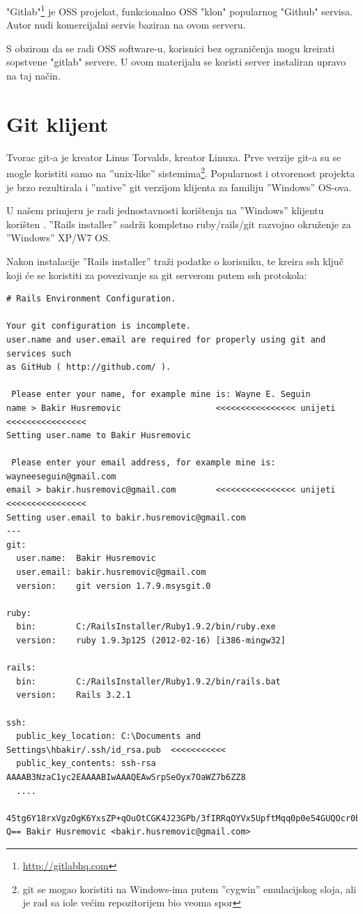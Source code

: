 \documentclass[times, utf8, seminar]{fit}
\begin{document}
"Gitlab"\footnote{\url{http://gitlabhq.com}} je OSS projekat, funkcionalno OSS "klon" popularnog "Github" servisa. 
Autor nudi komercijalni servis \href{https://gitlab.com}{\color{blue}{''gitlab.com''}} baziran na ovom serveru.

S obzirom da se radi OSS software-u, korisnici bez ograničenja mogu kreirati sopstvene "gitlab" servere.
U ovom materijalu se koristi server \href{https://gitlab.knowhow.out.ba}{\color{blue}{''gitlab.knowhow.out.ba''}} instaliran upravo na taj način.

\section{Git klijent}

Tvorac git-a je kreator Linus Torvalds, kreator Linuxa. Prve verzije git-a su se mogle koristiti samo na ''unix-like'' sistemima\footnote{git se mogao koristiti na Windows-ima putem ''cygwin'' emulacijskog sloja, ali je rad sa iole većim repozitorijem bio veoma spor}. 
Popularnost i otvorenost projekta je brzo rezultirala i ''native'' git verzijom klijenta za familiju ''Windows'' OS-ova.

U našem primjeru je radi jednostavnosti korištenja na ''Windows'' klijentu korišten \href{http://railsinstaller.org/}{\color{blue}{''Rails installer''}}. 
''Rails installer'' sadrži kompletno ruby/rails/git razvojno okruženje za ''Windows'' XP/W7 OS.

Nakon instalacije ''Rails installer'' traži podatke o korisniku, te kreira ssh ključ koji će se koristiti za povezivanje sa git serverom putem ssh protokola:

\begin{lstlisting}
# Rails Environment Configuration.

Your git configuration is incomplete.
user.name and user.email are required for properly using git and services such
as GitHub ( http://github.com/ ).

 Please enter your name, for example mine is: Wayne E. Seguin
name > Bakir Husremovic                   <<<<<<<<<<<<<<<< unijeti <<<<<<<<<<<<<<<<
Setting user.name to Bakir Husremovic

 Please enter your email address, for example mine is: wayneeseguin@gmail.com
email > bakir.husremovic@gmail.com        <<<<<<<<<<<<<<<< unijeti <<<<<<<<<<<<<<<<
Setting user.email to bakir.husremovic@gmail.com
---
git:
  user.name:  Bakir Husremovic
  user.email: bakir.husremovic@gmail.com
  version:    git version 1.7.9.msysgit.0

ruby:
  bin:        C:/RailsInstaller/Ruby1.9.2/bin/ruby.exe
  version:    ruby 1.9.3p125 (2012-02-16) [i386-mingw32]

rails:
  bin:        C:/RailsInstaller/Ruby1.9.2/bin/rails.bat
  version:    Rails 3.2.1

ssh:
  public_key_location: C:\Documents and Settings\hbakir/.ssh/id_rsa.pub  <<<<<<<<<<<
  public_key_contents: ssh-rsa AAAAB3NzaC1yc2EAAAABIwAAAQEAwSrpSeOyx7OaWZ7b6ZZ8
  ....
  45tg6Y18rxVgzOgK6YxsZP+qOuOtCGK4J23GPb/3fIRRqOYVx5UpftMqq0p0e54GUQOcr0bS+/ooYNC
Q== Bakir Husremovic <bakir.husremovic@gmail.com>
\end{lstlisting}
\end{document}
